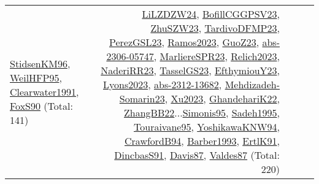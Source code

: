 {\begin{longtable}{p{3cm}r>{\raggedright\arraybackslash}p{6cm}>{\raggedright\arraybackslash}p{6cm}>{\raggedright\arraybackslash}p{8cm}}
\hyperref[detail:StidsenKM96]{StidsenKM96}, \hyperref[detail:WeilHFP95]{WeilHFP95}, \hyperref[detail:Clearwater1991]{Clearwater1991}, \hyperref[detail:FoxS90]{FoxS90} (Total: 141) & \hyperref[detail:LiLZDZW24]{LiLZDZW24}, \hyperref[detail:BofillCGGPSV23]{BofillCGGPSV23}, \hyperref[detail:ZhuSZW23]{ZhuSZW23}, \hyperref[detail:TardivoDFMP23]{TardivoDFMP23}, \hyperref[detail:PerezGSL23]{PerezGSL23}, \hyperref[detail:Ramos2023]{Ramos2023}, \hyperref[detail:GuoZ23]{GuoZ23}, \hyperref[detail:abs-2306-05747]{abs-2306-05747}, \hyperref[detail:MarliereSPR23]{MarliereSPR23}, \hyperref[detail:Relich2023]{Relich2023}, \hyperref[detail:NaderiRR23]{NaderiRR23}, \hyperref[detail:TasselGS23]{TasselGS23}, \hyperref[detail:EfthymiouY23]{EfthymiouY23}, \hyperref[detail:Lyons2023]{Lyons2023}, \hyperref[detail:abs-2312-13682]{abs-2312-13682}, \hyperref[detail:Mehdizadeh-Somarin23]{Mehdizadeh-Somarin23}, \hyperref[detail:Xu2023]{Xu2023}, \hyperref[detail:GhandehariK22]{GhandehariK22}, \hyperref[detail:ZhangBB22]{ZhangBB22}...\hyperref[detail:Simonis95]{Simonis95}, \hyperref[detail:Sadeh1995]{Sadeh1995}, \hyperref[detail:Touraivane95]{Touraivane95}, \hyperref[detail:YoshikawaKNW94]{YoshikawaKNW94}, \hyperref[detail:CrawfordB94]{CrawfordB94}, \hyperref[detail:Barber1993]{Barber1993}, \hyperref[detail:ErtlK91]{ErtlK91}, \hyperref[detail:DincbasS91]{DincbasS91}, \hyperref[detail:Davis87]{Davis87}, \hyperref[detail:Valdes87]{Valdes87} (Total: 220)\\
\end{longtable}
}

\clearpage
